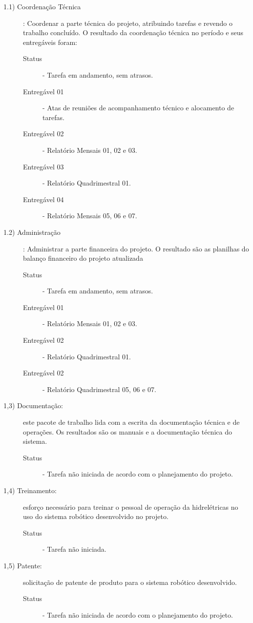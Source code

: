 \begin{description}

\item[1.1) Coordenação Técnica]: Coordenar a parte técnica do projeto, atribuindo tarefas e revendo o trabalho concluído. O resultado da coordenação técnica no período e seus entregáveis foram: 

\begin{description}
	\item [Status] - Tarefa em andamento, sem atrasos. 
	\item [Entregável 01] - Atas de reuniões de acompanhamento técnico e alocamento de tarefas.  
	\item [Entregável 02] - Relatório Mensais 01, 02 e 03. 
	\item [Entregável 03] - Relatório Quadrimestral 01. 
	\item [Entregável 04] - Relatório Mensais 05, 06 e 07.
\end{description} 


\item[1.2) Administração]:  Administrar a parte financeira do projeto. O resultado são as planilhas do balanço financeiro do projeto atualizada 

\begin{description}
	\item [Status] - Tarefa em andamento, sem atrasos.  
	\item [Entregável 01] - Relatório Mensais 01, 02 e 03. 
	\item [Entregável 02] - Relatório Quadrimestral 01. 
	\item [Entregável 02] - Relatório Quadrimestral 05, 06 e 07. 
\end{description} 


	\item[1,3) Documentação:] este pacote de trabalho lida com a escrita da documentação técnica e de operações. Os resultados são os manuais e a documentação técnica do sistema.

\begin{description}
	\item [Status] - Tarefa não iniciada de acordo com o planejamento do projeto. 
\end{description} 

	\item[1,4) Treinamento:] esforço necessário para treinar o pessoal de operação da hidrelétricas no uso do  sistema robótico desenvolvido no projeto.

\begin{description}
	\item [Status] - Tarefa não iniciada. 
\end{description} 

	\item[1,5) Patente:] solicitação de patente de produto para o sistema robótico desenvolvido.

\begin{description}
	\item [Status] - Tarefa não iniciada de acordo com o planejamento do projeto.  
\end{description} 

\end{description}



